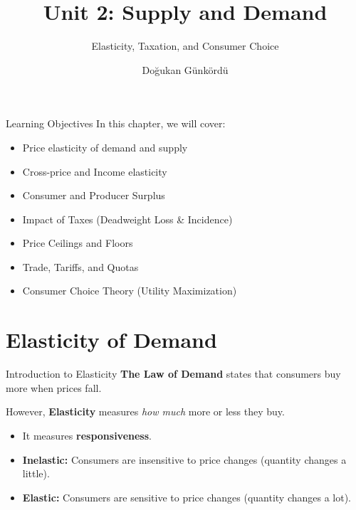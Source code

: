 \documentclass[aspectratio=169]{beamer}
\title{Unit 2: Supply and Demand}
\subtitle{Elasticity, Taxation, and Consumer Choice}
\author{Doğukan Günkördü}
\date{}
\begin{document}
\begin{frame}
    \titlepage
\end{frame}

\begin{frame}{Learning Objectives}
    In this chapter, we will cover:
    \begin{itemize}
        \item Price elasticity of demand and supply
        \item Cross-price and Income elasticity
        \item Consumer and Producer Surplus
        \item Impact of Taxes (Deadweight Loss & Incidence)
        \item Price Ceilings and Floors
        \item Trade, Tariffs, and Quotas
        \item Consumer Choice Theory (Utility Maximization)
    \end{itemize}
\end{frame}

\section{Elasticity of Demand}

\begin{frame}{Introduction to Elasticity}
    \textbf{The Law of Demand} states that consumers buy more when prices fall. 
    \vspace{0.5cm}
    
    However, \textbf{Elasticity} measures \textit{how much} more or less they buy.
    \begin{itemize}
        \item It measures \textbf{responsiveness}.
        \item \textbf{Inelastic:} Consumers are insensitive to price changes (quantity changes a little).
        \item \textbf{Elastic:} Consumers are sensitive to price changes (quantity changes a lot).
    \end{itemize}
\end{frame}
\end{document}
